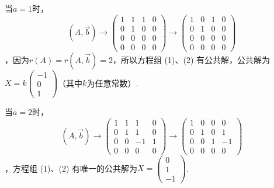 \documentclass[UTF8,12pt,a4paper,fontset=fandol]{ctexart}
\begin{document}
\begin{solve}
        当$a=1$时，
\[(A,\vec{b})\rightarrow\begin{pmatrix}
                1 & 1 & 1 & 0 \\
                0 & 1 & 0 & 0 \\
                0 & 0 & 0 & 0 \\
                0 & 0 & 0 & 0
            \end{pmatrix}\rightarrow\begin{pmatrix}
                1 & 0 & 1 & 0 \\
                0 & 1 & 0 & 0 \\
                0 & 0 & 0 & 0 \\
                0 & 0 & 0 & 0
            \end{pmatrix}\]
，因为$r(A)=r(A,\vec{b})=2$，所以方程组 (1)、(2) 有公共解，公共解为$X=k\begin{pmatrix} -1 \\ 0  \\ 1 \end{pmatrix}$（其中$k$为任意常数）.

        当$a=2$时，
\[(A,\vec{b})\rightarrow\begin{pmatrix}
                1 & 1 & 1  & 0 \\
                0 & 1 & 1  & 0 \\
                0 & 0 & -1 & 1 \\
                0 & 0 & 0  & 0
            \end{pmatrix}\rightarrow\begin{pmatrix}
                1 & 0 & 0 & 0  \\
                0 & 1 & 0 & 1  \\
                0 & 0 & 1 & -1 \\
                0 & 0 & 0 & 0
            \end{pmatrix}\]
，方程组 (1)、(2) 有唯一的公共解为$X=\begin{pmatrix}
                0 \\
                1 \\
                -1
            \end{pmatrix}$.
\end{solve}
\end{document}
